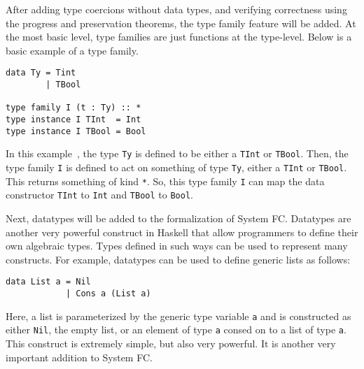 \documentclass{sig-alternate}
\begin{document}

After adding type coercions without data types, and verifying correctness using the progress and preservation theorems, the type family feature will be added. At the most basic level, type families are just functions at the type-level. Below is a basic example of a type family.
\begin{verbatim}
data Ty = Tint
        | TBool

type family I (t : Ty) :: *
type instance I TInt  = Int
type instance I TBool = Bool
\end{verbatim}
In this example~\cite{DBLP:conf/icfp/WeirichHE13}, the type \texttt{Ty} is defined to be either a \texttt{TInt} or \texttt{TBool}. Then, the type family \texttt{I} is defined to act on something of type \texttt{Ty}, either a \texttt{TInt} or \texttt{TBool}. This returns something of kind \texttt{*}. So, this type family \texttt{I} can map the data constructor \texttt{TInt} to \texttt{Int} and \texttt{TBool} to \texttt{Bool}.

Next, datatypes will be added to the formalization of System FC. Datatypes are another very powerful construct in Haskell that allow programmers to define their own algebraic types. Types defined in such ways can be used to represent many constructs. For example, datatypes can be used to define generic lists as follows:
\begin{verbatim}
data List a = Nil
            | Cons a (List a)
\end{verbatim}
Here, a list is parameterized by the generic type variable \texttt{a} and is constructed as either \texttt{Nil}, the empty list, or an element of type \texttt{a} consed on to a list of type \texttt{a}. This construct is extremely simple, but also very powerful.  It is another very important addition to System FC.
\end{document}
